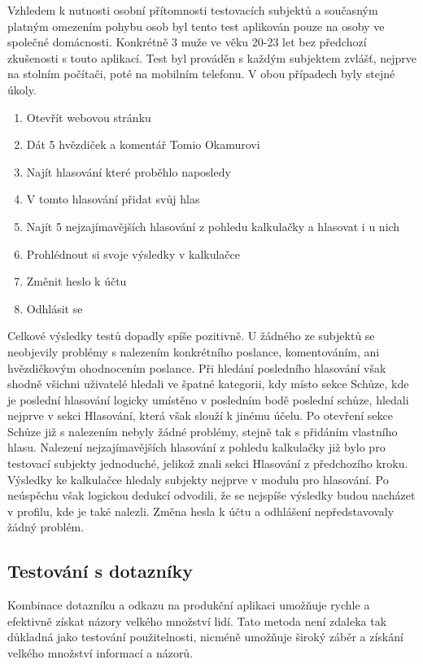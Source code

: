 \par Vzhledem k nutnosti osobní přítomnosti testovacích subjektů a současným platným omezením pohybu osob byl tento test aplikován pouze na osoby ve společné domácnosti. Konkrétně 3 muže ve věku 20-23 let bez předchozí zkušenosti s touto aplikací. Test byl prováděn s každým subjektem zvlášť, nejprve na stolním počítači, poté na mobilním telefonu. V obou případech byly stejné úkoly. 
\begin{enumerate}
    \item Otevřít webovou stránku
    \item Dát 5 hvězdiček a komentář Tomio Okamurovi
    \item Najít hlasování které proběhlo naposledy
    \item V tomto hlasování přidat svůj hlas
    \item Najít 5 nejzajímavějších hlasování z pohledu kalkulačky a hlasovat i u nich
    \item Prohlédnout si svoje výsledky v kalkulačce
    \item Změnit heslo k účtu
    \item Odhlásit se
\end{enumerate}

Celkové výsledky testů dopadly spíše pozitivně. U žádného ze subjektů se neobjevily problémy s nalezením konkrétního poslance, komentováním, ani hvězdičkovým ohodnocením poslance. Při hledání posledního hlasování však shodně všichni uživatelé hledali ve špatné kategorii, kdy místo sekce Schůze, kde je poslední hlasování logicky umístěno v posledním bodě poslední schůze, hledali nejprve v sekci Hlasování, která však slouží k jinému účelu. Po otevření sekce Schůze již s nalezením nebyly žádné problémy, stejně tak s přidáním vlastního hlasu. Nalezení nejzajímavějších hlasování z pohledu kalkulačky již bylo pro testovací subjekty jednoduché, jelikož znali sekci Hlasování z předchozího kroku. Výsledky ke kalkulačce hledaly subjekty nejprve v modulu pro hlasování. Po neúspěchu však logickou dedukcí odvodili, že se nejspíše výsledky budou nacházet v profilu, kde je také nalezli. Změna hesla k účtu a odhlášení nepředstavovaly žádný problém.\\



\subsection{Testování s dotazníky}
Kombinace dotazníku a odkazu na produkční aplikaci umožňuje rychle a efektivně získat názory velkého množství lidí. Tato metoda není zdaleka tak důkladná jako testování použitelnosti, nicméně umožňuje široký záběr a získání velkého množství informací a názorů.

